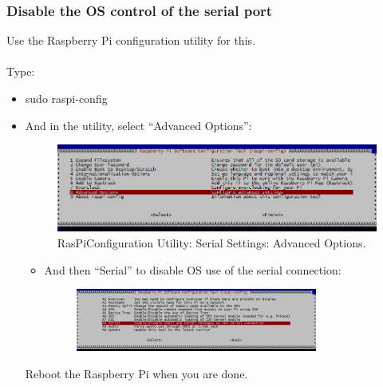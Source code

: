 \documentclass[a4paper,12pt,oneside]{book}
\begin{document}
	 \subsubsection{Disable the OS control of the serial port}
	 Use the Raspberry Pi configuration utility for this.
		\paragraph{}Type:
			\begin{itemize}
				\item sudo raspi-config
				\item And in the utility, select 								“Advanced Options”:
				\begin{figure}[H]
	 	\centering
		\includegraphics[scale=0.37]{adv1}
	 	\caption{RasPiConfiguration Utility: Serial Settings: Advanced Options.}
\end{figure}
		\begin{itemize}
			\item And then “Serial” to disable OS use of the serial connection:
			\begin{figure}[H]
	 	\centering
		\includegraphics[scale=0.85]{adv2}
\end{figure}
		\end{itemize}
Reboot the Raspberry Pi when you are done.
			\end{itemize}
\end{document}
